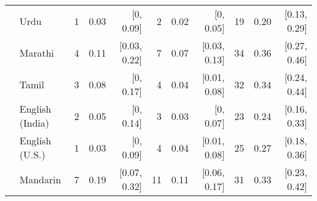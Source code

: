 \begin{table}[t]
\begin{footnotesize}
\begin{tabular}{p{.1in}lrrrrrrrrr}
 & Urdu & 1 & 0.03 & [0, 0.09] & 2 & 0.02 & [0, 0.05] & 19 & 0.20 & [0.13, 0.29]\\

 & Marathi & 4 & 0.11 & [0.03, 0.22] & 7 & 0.07 & [0.03, 0.13] & 34 & 0.36 & [0.27, 0.46]\\

 & Tamil & 3 & 0.08 & [0, 0.17] & 4 & 0.04 & [0.01, 0.08] & 32 & 0.34 & [0.24, 0.44]\\

 & English (India) & 2 & 0.05 & [0, 0.14] & 3 & 0.03 & [0, 0.07] & 23 & 0.24 & [0.16, 0.33]\\

 & English (U.S.) & 1 & 0.03 & [0, 0.09] & 4 & 0.04 & [0.01, 0.08] & 25 & 0.27 & [0.18, 0.36]\\

& Mandarin & 7 & 0.19 & [0.07, 0.32] & 11 & 0.11 & [0.06, 0.17] & 31 & 0.33 & [0.23, 0.42]\\
\bottomrule
\end{tabular}
\end{footnotesize}
\end{table}